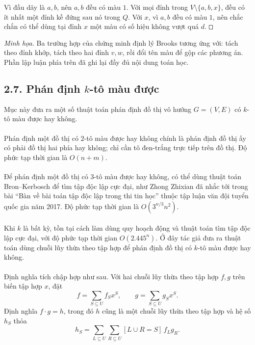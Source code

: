 \documentclass[11pt]{article}
\newcommand{\square}{\mathord{\vcenter{\hrule height .5pt
  \hbox{\vrule width .5pt height 5pt\kern5pt\vrule width .5pt}
  \hrule height .5pt}}}
\begin{document}
Vì đầu dãy là \(a,b\), nên \(a,b\) đều có màu \(1\). Với mọi đỉnh trong
\(V\setminus\{a,b,x\}\), đều có ít nhất một đỉnh kề đứng sau nó trong \(Q\).
Với \(x\), vì \(a,b\) đều có màu \(1\), nên chắc chắn có thể dùng tại đỉnh
\(x\) một màu có số hiệu không vượt quá \(d\). \(\square\)

\emph{Minh họa.} Ba trường hợp của chứng minh định lý Brooks tương ứng với:
tách theo đỉnh khớp, tách theo hai đỉnh \(v,w\), rồi đổi tên màu để gộp các
phương án. Phần lập luận phía trên đã ghi lại đầy đủ nội dung toán học.

\subsection*{2.7. Phán định \(k\)-tô màu được}

Mục này đưa ra một số thuật toán phán định đồ thị vô hướng \(G=(V,E)\) có
\(k\)-tô màu được hay không.

\paragraph{}
Phán định một đồ thị có \(2\)-tô màu được hay không chính là phán định đồ thị
ấy có phải đồ thị hai phía hay không; chỉ cần tô đen-trắng trực tiếp trên đồ
thị. Độ phức tạp thời gian là \(O(n+m)\).

\paragraph{}
Để phán định một đồ thị có \(3\)-tô màu được hay không, có thể dùng thuật toán
Bron--Kerbosch để tìm tập độc lập cực đại, như Zhong Zhixian đã nhắc tới trong
bài ``Bàn về bài toán tập độc lập trong thi tin học'' thuộc tập luận văn đội
tuyển quốc gia năm 2017. Độ phức tạp thời gian là \(O(3^{n/3}n^2)\).

\paragraph{}
Khi \(k\) là bất kỳ, tồn tại cách làm dùng quy hoạch động và thuật toán tìm
tập độc lập cực đại, với độ phức tạp thời gian \(O(2.445^n)\). Ở đây tác giả
đưa ra thuật toán dùng chuỗi lũy thừa theo tập hợp để phán định đồ thị có
\(k\)-tô màu được hay không.

\paragraph{}
Định nghĩa tích chập hợp như sau. Với hai chuỗi lũy thừa theo tập hợp \(f,g\)
trên biến tập hợp \(x\), đặt
\[
  f=\sum_{S\subseteq U} f_S x^S,\qquad
  g=\sum_{S\subseteq U} g_S x^S.
\]
Định nghĩa \(f\cdot g=h\), trong đó \(h\) cũng là một chuỗi lũy thừa theo tập
hợp và hệ số \(h_S\) thỏa
\[
  h_S=\sum_{L\subseteq U}\sum_{R\subseteq U}
       [L\cup R=S]\,f_L g_R. \tag{1}
\]
\end{document}
